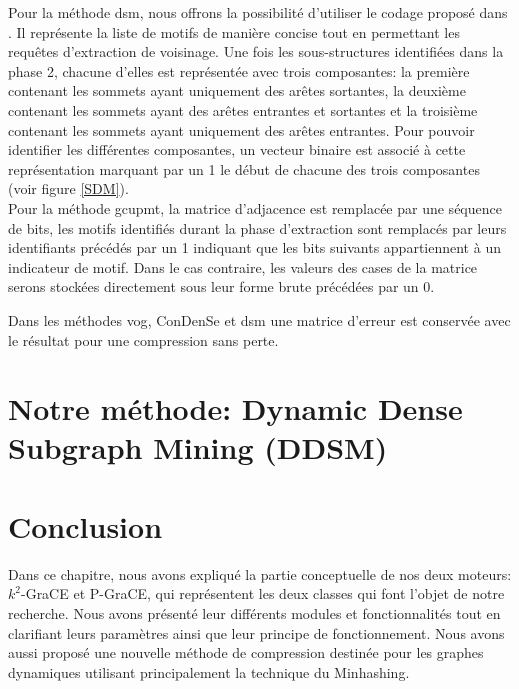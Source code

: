 \documentclass[a4paper,oneside,12pt]{report}
\theoremstyle{definition}
\begin{document}
Pour la méthode \gls{dsm}, nous offrons  la possibilité d'utiliser le codage proposé dans \citep{liu2018reducing}. Il représente la liste de motifs de manière concise tout en permettant les requêtes d'extraction de voisinage. %
Une fois les sous-structures identifiées dans la phase 2, chacune d'elles est représentée avec trois composantes: la première contenant les sommets ayant uniquement des arêtes sortantes, la deuxième contenant les sommets ayant des arêtes entrantes et sortantes et la troisième contenant les sommets ayant uniquement des arêtes entrantes. Pour pouvoir identifier les différentes composantes,  un vecteur binaire est associé à cette représentation marquant par un 1 le début de chacune des trois composantes (voir figure \ref{SDM}).\\

Pour la méthode \gls{gcupmt}, la matrice d'adjacence est remplacée par une séquence de bits, les motifs identifiés durant la phase d'extraction sont remplacés par leurs identifiants précédés par un 1 indiquant que les bits suivants appartiennent à un indicateur de motif. Dans le cas contraire, les valeurs des cases de la matrice serons stockées directement sous leur forme brute précédées par un 0.


Dans les méthodes \gls{vog}, \gls{ConDenSe} et \gls{dsm} une matrice d'erreur est conservée avec le résultat pour une compression sans perte.
		
		
		
	\section{Notre méthode: Dynamic Dense Subgraph Mining (DDSM)}
		
	
	\section{Conclusion}

Dans ce chapitre, nous avons expliqué la partie conceptuelle de nos deux moteurs: $k^2$-GraCE et P-GraCE, qui  représentent les deux classes qui font l'objet de notre recherche. Nous avons présenté leur différents modules et fonctionnalités tout en clarifiant leurs paramètres ainsi que leur principe de fonctionnement. Nous avons aussi proposé une nouvelle méthode de compression destinée pour les graphes dynamiques utilisant principalement la technique du Minhashing.
\end{document}
